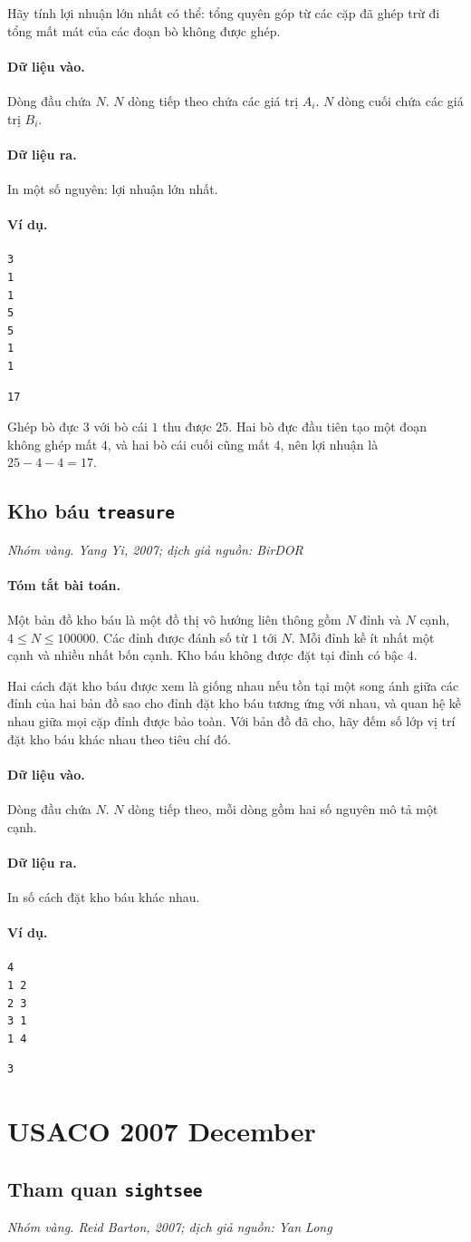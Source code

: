 \documentclass[11pt]{article}
\newcommand{\problem}[4]{%
  \subsection[#1 (#2)]{#1 \hfill {\normalsize\texttt{#2}}}%
  \noindent\textit{#3. #4}\par\smallskip
}
\newcommand{\iosec}[1]{\paragraph{#1}}
\begin{document}
Hãy tính lợi nhuận lớn nhất có thể: tổng quyên góp từ các cặp đã ghép trừ đi
tổng mất mát của các đoạn bò không được ghép.

\iosec{Dữ liệu vào.}
Dòng đầu chứa \(N\). \(N\) dòng tiếp theo chứa các giá trị \(A_i\). \(N\)
dòng cuối chứa các giá trị \(B_i\).

\iosec{Dữ liệu ra.}
In một số nguyên: lợi nhuận lớn nhất.

\iosec{Ví dụ.}
\begin{verbatim}
3
1
1
5
5
1
1
\end{verbatim}

\begin{verbatim}
17
\end{verbatim}

Ghép bò đực \(3\) với bò cái \(1\) thu được \(25\). Hai bò đực đầu tiên tạo
một đoạn không ghép mất \(4\), và hai bò cái cuối cũng mất \(4\), nên lợi
nhuận là \(25-4-4=17\).

\problem{Kho báu}{treasure}{Nhóm vàng}{Yang Yi, 2007; dịch giả nguồn: BirDOR}

\iosec{Tóm tắt bài toán.}
Một bản đồ kho báu là một đồ thị vô hướng liên thông gồm \(N\) đỉnh và \(N\)
cạnh, \(4\le N\le 100000\). Các đỉnh được đánh số từ \(1\) tới \(N\). Mỗi
đỉnh kề ít nhất một cạnh và nhiều nhất bốn cạnh. Kho báu không được đặt tại
đỉnh có bậc \(4\).

Hai cách đặt kho báu được xem là giống nhau nếu tồn tại một song ánh giữa các
đỉnh của hai bản đồ sao cho đỉnh đặt kho báu tương ứng với nhau, và quan hệ
kề nhau giữa mọi cặp đỉnh được bảo toàn. Với bản đồ đã cho, hãy đếm số lớp
vị trí đặt kho báu khác nhau theo tiêu chí đó.

\iosec{Dữ liệu vào.}
Dòng đầu chứa \(N\). \(N\) dòng tiếp theo, mỗi dòng gồm hai số nguyên mô tả
một cạnh.

\iosec{Dữ liệu ra.}
In số cách đặt kho báu khác nhau.

\iosec{Ví dụ.}
\begin{verbatim}
4
1 2
2 3
3 1
1 4
\end{verbatim}

\begin{verbatim}
3
\end{verbatim}

\section{USACO 2007 December}

\problem{Tham quan}{sightsee}{Nhóm vàng}{Reid Barton, 2007; dịch giả nguồn: Yan Long}
\end{document}
